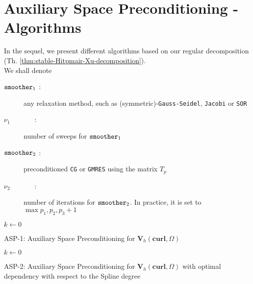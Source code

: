 \section{Auxiliary Space Preconditioning - Algorithms}

In the sequel, we present different algorithms based on our regular decomposition (Th. \ref{thm:stable-Hitpmair-Xu-decomposition}).
\\
We shall denote
\begin{description}
  \item[$\mbox{\texttt{smoother}}_1$ :] any relaxation method, such as (symmetric)-\texttt{Gauss-Seidel}, \texttt{Jacobi} or \texttt{SOR}
  \item[$\nu_1 \quad \quad \quad~$ :] number of sweeps for $\mbox{\texttt{smoother}}_1$
  \item[$\mbox{\texttt{smoother}}_2$ :] preconditioned \texttt{CG} or \texttt{GMRES} using the matrix $T_p$
  \item[$\nu_2 \quad \quad \quad~$ :] number of iterations for $\mbox{\texttt{smoother}}_2$. In practice, it is set to $\max{p_1, p_2, p_3}+1$
\end{description}

\begin{algorithm}[H]
\DontPrintSemicolon
\SetAlgoLined
{}
\BlankLine

  $k \gets 0$\;

\caption{{\sc ASP-1}: Auxiliary Space Preconditioning for $\bm{V}_h(\textbf{curl},\Omega)$}
\end{algorithm} 

\begin{algorithm}[H]
\DontPrintSemicolon
\SetAlgoLined
{}
\BlankLine

  $k \gets 0$\;

\caption{{\sc ASP-2}: Auxiliary Space Preconditioning for $\bm{V}_h(\textbf{curl},\Omega)$ with optimal dependency with respect to the Spline degree}
\end{algorithm} 
